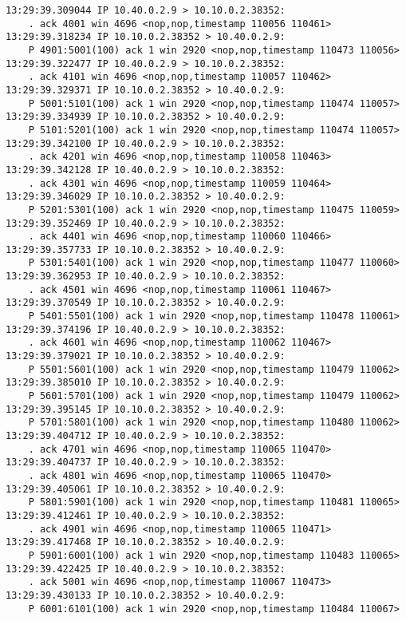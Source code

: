 \documentclass[a4paper,12pt]{article}
\begin{document}
\begin{Verbatim}
13:29:39.309044 IP 10.40.0.2.9 > 10.10.0.2.38352: 
    . ack 4001 win 4696 <nop,nop,timestamp 110056 110461>
13:29:39.318234 IP 10.10.0.2.38352 > 10.40.0.2.9: 
    P 4901:5001(100) ack 1 win 2920 <nop,nop,timestamp 110473 110056>
13:29:39.322477 IP 10.40.0.2.9 > 10.10.0.2.38352: 
    . ack 4101 win 4696 <nop,nop,timestamp 110057 110462>
13:29:39.329371 IP 10.10.0.2.38352 > 10.40.0.2.9: 
    P 5001:5101(100) ack 1 win 2920 <nop,nop,timestamp 110474 110057>
13:29:39.334939 IP 10.10.0.2.38352 > 10.40.0.2.9: 
    P 5101:5201(100) ack 1 win 2920 <nop,nop,timestamp 110474 110057>
13:29:39.342100 IP 10.40.0.2.9 > 10.10.0.2.38352: 
    . ack 4201 win 4696 <nop,nop,timestamp 110058 110463>
13:29:39.342128 IP 10.40.0.2.9 > 10.10.0.2.38352: 
    . ack 4301 win 4696 <nop,nop,timestamp 110059 110464>
13:29:39.346029 IP 10.10.0.2.38352 > 10.40.0.2.9: 
    P 5201:5301(100) ack 1 win 2920 <nop,nop,timestamp 110475 110059>
13:29:39.352469 IP 10.40.0.2.9 > 10.10.0.2.38352: 
    . ack 4401 win 4696 <nop,nop,timestamp 110060 110466>
13:29:39.357733 IP 10.10.0.2.38352 > 10.40.0.2.9: 
    P 5301:5401(100) ack 1 win 2920 <nop,nop,timestamp 110477 110060>
13:29:39.362953 IP 10.40.0.2.9 > 10.10.0.2.38352: 
    . ack 4501 win 4696 <nop,nop,timestamp 110061 110467>
13:29:39.370549 IP 10.10.0.2.38352 > 10.40.0.2.9: 
    P 5401:5501(100) ack 1 win 2920 <nop,nop,timestamp 110478 110061>
13:29:39.374196 IP 10.40.0.2.9 > 10.10.0.2.38352: 
    . ack 4601 win 4696 <nop,nop,timestamp 110062 110467>
13:29:39.379021 IP 10.10.0.2.38352 > 10.40.0.2.9: 
    P 5501:5601(100) ack 1 win 2920 <nop,nop,timestamp 110479 110062>
13:29:39.385010 IP 10.10.0.2.38352 > 10.40.0.2.9: 
    P 5601:5701(100) ack 1 win 2920 <nop,nop,timestamp 110479 110062>
13:29:39.395145 IP 10.10.0.2.38352 > 10.40.0.2.9: 
    P 5701:5801(100) ack 1 win 2920 <nop,nop,timestamp 110480 110062>
13:29:39.404712 IP 10.40.0.2.9 > 10.10.0.2.38352: 
    . ack 4701 win 4696 <nop,nop,timestamp 110065 110470>
13:29:39.404737 IP 10.40.0.2.9 > 10.10.0.2.38352: 
    . ack 4801 win 4696 <nop,nop,timestamp 110065 110470>
13:29:39.405061 IP 10.10.0.2.38352 > 10.40.0.2.9: 
    P 5801:5901(100) ack 1 win 2920 <nop,nop,timestamp 110481 110065>
13:29:39.412461 IP 10.40.0.2.9 > 10.10.0.2.38352: 
    . ack 4901 win 4696 <nop,nop,timestamp 110065 110471>
13:29:39.417468 IP 10.10.0.2.38352 > 10.40.0.2.9: 
    P 5901:6001(100) ack 1 win 2920 <nop,nop,timestamp 110483 110065>
13:29:39.422425 IP 10.40.0.2.9 > 10.10.0.2.38352: 
    . ack 5001 win 4696 <nop,nop,timestamp 110067 110473>
13:29:39.430133 IP 10.10.0.2.38352 > 10.40.0.2.9: 
    P 6001:6101(100) ack 1 win 2920 <nop,nop,timestamp 110484 110067>

\end{Verbatim}
\end{document}
